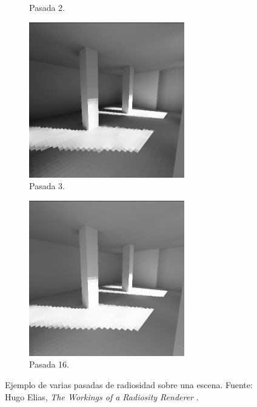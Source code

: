 \begin{figure}[H]
\begin{subfigure}{0.24\textwidth}
		\captionsetup{width=0.95\textwidth, justification=centering}
		\caption*{Pasada 2.}
	\end{subfigure}%
	\begin{subfigure}{0.24\textwidth}
		\centering
		\includegraphics[width=.95\linewidth]{media/radiosity3.png}
		\captionsetup{width=0.95\textwidth, justification=centering}
		\caption*{Pasada 3.}
	\end{subfigure}
	\begin{subfigure}{0.24\textwidth}
		\centering
		\includegraphics[width=.95\linewidth]{media/radiosity16.png}
		\captionsetup{width=0.95\textwidth, justification=centering}
		\caption*{Pasada 16.}
	\end{subfigure}
	\caption{Ejemplo de varias pasadas de radiosidad sobre una escena. Fuente: Hugo Elias, \emph{The Workings of a Radiosity Renderer} \cite{hugo2000}.}
	\label{fig:radiosity2}
\end{figure}


